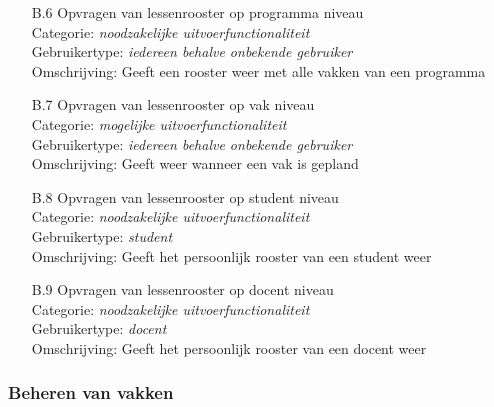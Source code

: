 \documentclass{article}
\begin{document}
\begin{itemize}
\item[B.6] Opvragen van lessenrooster op programma niveau \\
Categorie: \textit{noodzakelijke uitvoerfunctionaliteit} \\
Gebruikertype: \textit{iedereen behalve onbekende gebruiker} \\
Omschrijving: Geeft een rooster weer met alle vakken van een programma\\[-3mm]

\item[B.7] Opvragen van lessenrooster op vak niveau \\
Categorie: \textit{mogelijke uitvoerfunctionaliteit} \\
Gebruikertype: \textit{iedereen behalve onbekende gebruiker} \\
Omschrijving: Geeft weer wanneer een vak is gepland \\[-3mm]

\item[B.8] Opvragen van lessenrooster op student niveau \\
Categorie: \textit{noodzakelijke uitvoerfunctionaliteit} \\
Gebruikertype: \textit{student} \\
Omschrijving: Geeft het persoonlijk rooster van een student weer \\[-3mm]

\item[B.9] Opvragen van lessenrooster op docent niveau \\
Categorie: \textit{noodzakelijke uitvoerfunctionaliteit} \\
Gebruikertype: \textit{docent} \\
Omschrijving: Geeft het persoonlijk rooster van een docent weer \\[-3mm]
\end{itemize}

\subsubsection{Beheren van vakken}
\end{document}

